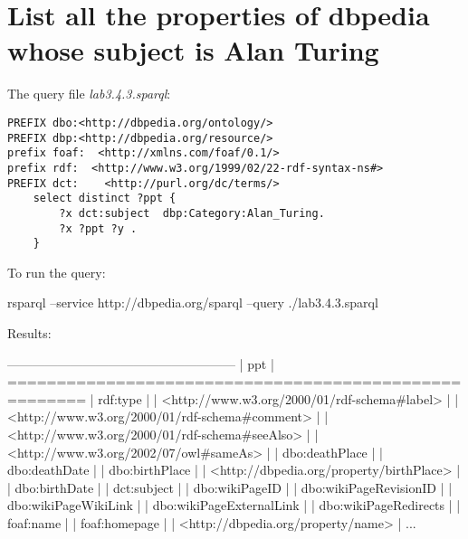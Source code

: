 \documentclass[a4paper, 12pt]{report}
\begin{document}
\section{List all the properties of dbpedia whose subject is Alan Turing}
The query file \emph{lab3.4.3.sparql}:
\begin{lstlisting}[frame=single]
PREFIX dbo:<http://dbpedia.org/ontology/>
PREFIX dbp:<http://dbpedia.org/resource/>
prefix foaf:  <http://xmlns.com/foaf/0.1/>
prefix rdf:  <http://www.w3.org/1999/02/22-rdf-syntax-ns#>
PREFIX dct:    <http://purl.org/dc/terms/>
    select distinct ?ppt {
        ?x dct:subject  dbp:Category:Alan_Turing.
        ?x ?ppt ?y .
    }
\end{lstlisting}
To run the query:
\begin{commandshell}
    rsparql --service http://dbpedia.org/sparql --query ./lab3.4.3.sparql
\end{commandshell}
Results:
\begin{messageshell}
------------------------------------------------------
| ppt                                                |
======================================================
| rdf:type                                           |
| <http://www.w3.org/2000/01/rdf-schema#label>       |
| <http://www.w3.org/2000/01/rdf-schema#comment>     |
| <http://www.w3.org/2000/01/rdf-schema#seeAlso>     |
| <http://www.w3.org/2002/07/owl#sameAs>             |
| dbo:deathPlace                                     |
| dbo:deathDate                                      |
| dbo:birthPlace                                     |
| <http://dbpedia.org/property/birthPlace>           |
| dbo:birthDate                                      |
| dct:subject                                        |
| dbo:wikiPageID                                     |
| dbo:wikiPageRevisionID                             |
| dbo:wikiPageWikiLink                               |
| dbo:wikiPageExternalLink                           |
| dbo:wikiPageRedirects                              |
| foaf:name                                          |
| foaf:homepage                                      |
| <http://dbpedia.org/property/name>                 |
...
\end{messageshell}
\end{document}
